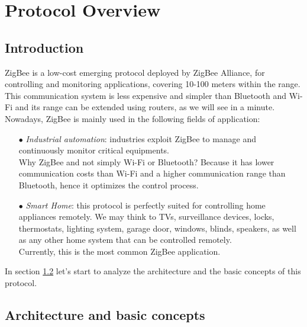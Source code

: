 \documentclass[12pt]{report}
\begin{document}
{{\chapter{Protocol Overview}

\section{Introduction}
\bigskip

ZigBee is a low-cost emerging protocol deployed by ZigBee Alliance, for controlling and monitoring applications, covering 10-100 meters within the range. \\
This communication system is less expensive and simpler than Bluetooth and Wi-Fi and its range can be extended using routers, as we will see in a minute.\\

Nowadays, ZigBee is mainly used in the following fields of application:
\begin{itemize}
\setlength{\itemindent}{+4mm}
\item[$\bullet$] \emph{Industrial automation}: industries exploit ZigBee to manage and continuously monitor critical equipments.\\
Why ZigBee and not simply Wi-Fi or Bluetooth? Because it has lower communication costs than Wi-Fi and a higher communication range than Bluetooth, hence it optimizes the control process.
\item[$\bullet$] \emph{Smart Home}: this protocol is perfectly suited for controlling home appliances remotely. We may think to TVs, surveillance devices, locks, thermostats, lighting system, garage door, windows, blinds, speakers, as well as any other home system that can be controlled remotely.\\
Currently, this is the most common ZigBee application.\\

\end{itemize}

In section \ref{sec:zigbeearch} let's start to analyze the architecture and the basic concepts of this protocol.\\

\section{Architecture and basic concepts}
\label{sec:zigbeearch}
\bigskip

}}
\end{document}
